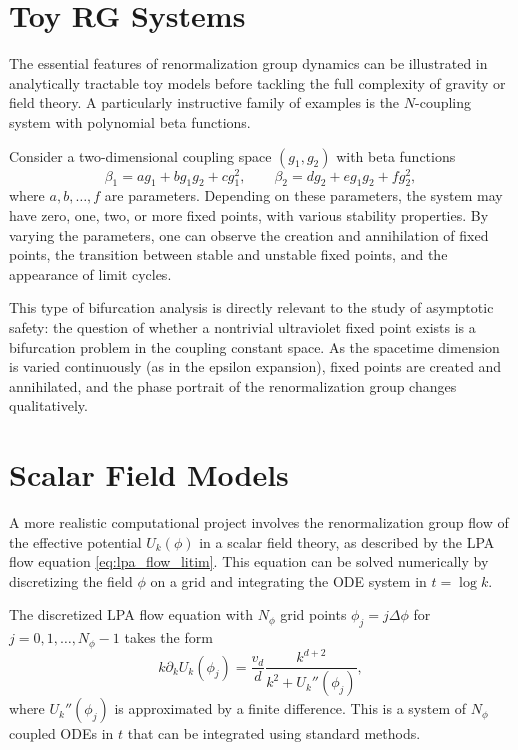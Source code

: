 \documentclass[11pt, twoside, openright]{book}
\theoremstyle{dotted}
\theoremstyle{definition}
\newcommand{\kdk}{k\partial_k}         %
\begin{document}
\section{Toy RG Systems}

The essential features of renormalization group dynamics can be illustrated in
analytically tractable toy models before tackling the full complexity of gravity
or field theory. A particularly instructive family of examples is the $N$-coupling
system with polynomial beta functions.

Consider a two-dimensional coupling space $(g_1, g_2)$ with beta functions
\begin{equation}
  \beta_1 = ag_1 + bg_1 g_2 + cg_1^2, \qquad
  \beta_2 = dg_2 + eg_1 g_2 + fg_2^2,
  \label{eq:toy_beta}
\end{equation}
where $a, b, \ldots, f$ are parameters. Depending on these parameters, the system
may have zero, one, two, or more fixed points, with various stability properties.
By varying the parameters, one can observe the creation and annihilation of fixed
points, the transition between stable and unstable fixed points, and the
appearance of limit cycles.

This type of bifurcation analysis is directly relevant to the study of asymptotic
safety: the question of whether a nontrivial ultraviolet fixed point exists is a
bifurcation problem in the coupling constant space. As the spacetime dimension is
varied continuously (as in the epsilon expansion), fixed points are created and
annihilated, and the phase portrait of the renormalization group changes
qualitatively.

\section{Scalar Field Models}

A more realistic computational project involves the renormalization group flow of
the effective potential $U_k(\phi)$ in a scalar field theory, as described by the
LPA flow equation \eqref{eq:lpa_flow_litim}. This equation can be solved
numerically by discretizing the field $\phi$ on a grid and integrating the ODE
system in $t = \log k$.

The discretized LPA flow equation with $N_\phi$ grid points $\phi_j = j\Delta\phi$
for $j = 0, 1, \ldots, N_\phi - 1$ takes the form
\begin{equation}
  \kdk U_k(\phi_j) = \frac{v_d}{d}\frac{k^{d+2}}{k^2 + U_k''(\phi_j)},
  \label{eq:lpa_discrete}
\end{equation}
where $U_k''(\phi_j)$ is approximated by a finite difference. This is a system of
$N_\phi$ coupled ODEs in $t$ that can be integrated using standard methods.
\end{document}
